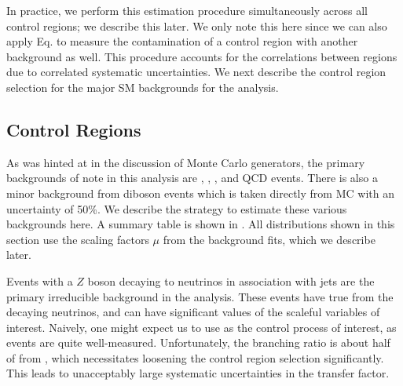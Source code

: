 In practice, we perform this estimation procedure simultaneously across all control regions; we describe this later.
We only note this here since we can also apply Eq. to measure the contamination of a control region with another background as well.
This procedure accounts for the correlations between regions due to correlated systematic uncertainties.
We next describe the control region selection for the major SM backgrounds for the analysis.

\subsection{Control Regions}

As was hinted at in the discussion of Monte Carlo generators, the primary backgrounds of note in this analysis are \zjets, \wjets, \ttbar, and QCD events.
There is also a minor background from diboson events which is taken directly from MC with an uncertainty of 50\%.
We describe the strategy to estimate these various backgrounds here.
A summary table is shown in .
All distributions shown in this section use the scaling factors $\mu$ from the background fits, which we describe later.


Events with a $Z$ boson decaying to neutrinos in association with jets are the primary irreducible background in the analysis.
These events have true \met from the decaying neutrinos, and can have significant values of the scaleful variables of interest.
Naively, one might expect us to use \Zll as the control process of interest, as \Zll events are quite well-measured.
Unfortunately, the \Zll branching ratio is about half of from \Zvv, which necessitates loosening the control region selection significantly.
This leads to unacceptably large systematic uncertainties in the transfer factor.

